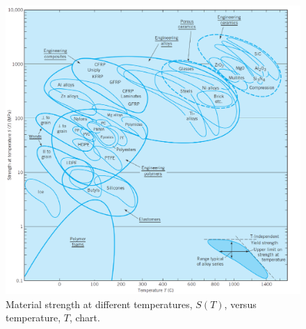 \documentclass[
10pt,
a4paper,
openany,
svgnames,
]{book}
\begin{document}
\begin{figure}[h]
  \centering
  \includegraphics[scale=0.82]{pictures/Material-selection/strength-temperature-diagram}
  \caption{Material strength at different temperatures, $S(T)$, versus temperature, $T$, chart. \cite{ashby2010materials}}
  \label{fig: strength temperature diagram}
\end{figure}
\end{document}
